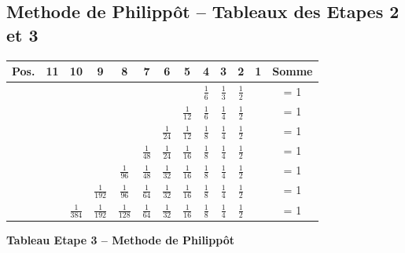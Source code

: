 \documentclass[a4paper,11pt]{article}
\begin{document}
\subsection{Methode de Philippôt -- Tableaux des Etapes 2 et 3}
\begin{center}
\scriptsize
\begin{tabular}{|c|c|c|c|c|c|c|c|c|c|c|c|c|}
\hline
\textbf{Pos.} & 11 & 10 & 9 & 8 & 7 & 6 & 5 & 4 & 3 & 2 & 1 & \textbf{Somme} \\
\hline
& & & & & & & & \(\frac{1}{6}\) & \(\frac{1}{3}\) & \(\frac{1}{2}\) & & = 1 \\
\hline
& & & & & & & \(\frac{1}{12}\) & \(\frac{1}{6}\) & \(\frac{1}{4}\) & \(\frac{1}{2}\) & & = 1 \\
\hline
& & & & & & \(\frac{1}{24}\) & \(\frac{1}{12}\) & \(\frac{1}{8}\) & \(\frac{1}{4}\) & \(\frac{1}{2}\) & & = 1 \\
\hline
& & & & & \(\frac{1}{48}\) & \(\frac{1}{24}\) & \(\frac{1}{16}\) & \(\frac{1}{8}\) & \(\frac{1}{4}\) & \(\frac{1}{2}\) & & = 1 \\
\hline
& & & & \(\frac{1}{96}\) & \(\frac{1}{48}\) & \(\frac{1}{32}\) & \(\frac{1}{16}\) & \(\frac{1}{8}\) & \(\frac{1}{4}\) & \(\frac{1}{2}\) & & = 1 \\
\hline
& & & \(\frac{1}{192}\) & \(\frac{1}{96}\) & \(\frac{1}{64}\) & \(\frac{1}{32}\) & \(\frac{1}{16}\) & \(\frac{1}{8}\) & \(\frac{1}{4}\) & \(\frac{1}{2}\) & & = 1 \\
\hline
& & \(\frac{1}{384}\) & \(\frac{1}{192}\) & \(\frac{1}{128}\) & \(\frac{1}{64}\) & \(\frac{1}{32}\) & \(\frac{1}{16}\) & \(\frac{1}{8}\) & \(\frac{1}{4}\) & \(\frac{1}{2}\) & & = 1 \\
\hline
\end{tabular}
\end{center}

\vspace{0.5cm}

\begin{center}
\textbf{Tableau Etape 3 -- Methode de Philippôt}
\end{center}
\end{document}
